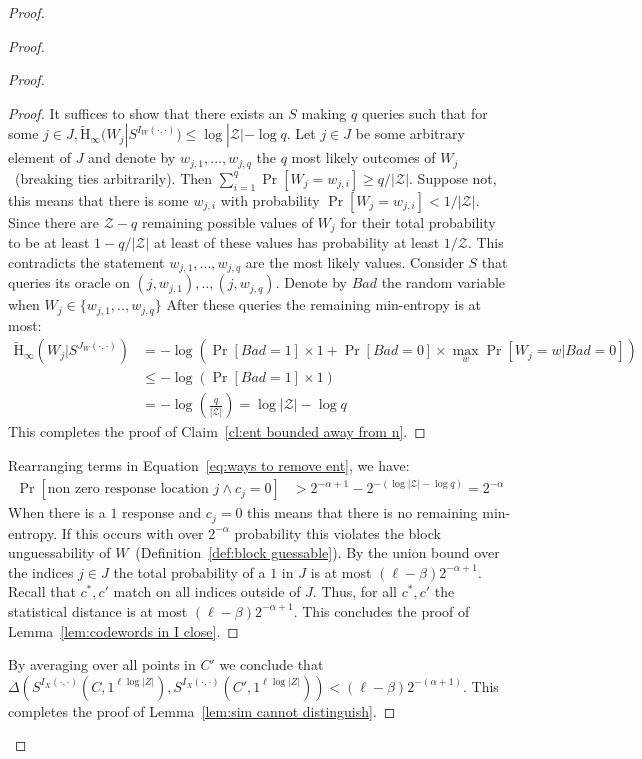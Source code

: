 \documentclass[11pt]{article}
\newcommand{\defref}[1]{\mbox{Definition~\ref{#1}}}
\newcommand{\lemref}[1]{\mbox{Lemma~\ref{#1}}}
\newcommand{\clref}[1]{\mbox{Claim~\ref{#1}}}
\newcommand{\Hav}{\tilde{\mathrm{H}}_\infty}
\begin{document}
\begin{proof}
\begin{proof}
\begin{proof}
\begin{proof}
It suffices to show that there exists an $S$ making $q$ queries such that for some $j\in J, \Hav(W_j | S^{I_{W}(\cdot, \cdot)})\le \log |\mathcal{Z}| - \log q$.  Let $j\in J$ be some arbitrary element of $J$ and denote by $w_{j,1}, ..., w_{j,q}$ the $q$ most likely outcomes of $W_j$~(breaking ties arbitrarily).  Then $\sum_{i=1}^q \Pr[W_j = w_{j,i}]\geq q/|\mathcal{Z}|$.  Suppose not, this means that there is some $w_{j,i}$ with probability $\Pr[W_j = w_{j,i}] < 1/|\mathcal{Z}|$.  Since there are $\mathcal{Z} - q $ remaining possible values of $W_j$ for their total probability to be at least $1-q/|\mathcal{Z}|$ at least of these values has probability at least $1/\mathcal{Z}$.  This contradicts the statement $w_{j,1},..., w_{j,q}$ are the most likely values.  Consider $S$ that queries its oracle on $(j, w_{j,1}),.., (j, w_{j,q})$.  Denote by $Bad$ the random variable when $W_j\in \{w_{j,1},.., w_{j,q}\}$  After these queries the remaining min-entropy is at most:
\begin{align*}
\Hav(W_j | S^{J_W(\cdot, \cdot)}) &=  -\log \left(\Pr[Bad=1]\times 1+ \Pr[Bad=0]\times \max_{w}\Pr[W_j = w| Bad =0]\right)\\
&\leq  -\log \left(\Pr[Bad=1]\times 1\right)\\
&=-\log\left( \frac{q}{|\mathcal{Z}|} \right) = \log|\mathcal{Z}|-\log q
\end{align*}
This completes the proof of \clref{cl:ent bounded away from n}.
\end{proof}
\noindent
Rearranging terms in Equation~\ref{eq:ways to remove ent}, we have:
\begin{align*}
 \Pr[\text{non zero response location }j \wedge c_j=0] &>2^{-\alpha+1} - 2^{-(\log |\mathcal{Z}|-\log q)}=  2^{-\alpha}
 \end{align*}
 When there is a $1$ response and $c_j=0$ this means that there is no remaining min-entropy.  If this occurs with over $2^{-\alpha}$ probability this violates the block unguessability of $W$~(\defref{def:block guessable}).  By the union bound over the indices $j\in J$ the total probability of a $1$ in $J$ is at most $(\ell-\beta)2^{-\alpha+1}$. Recall that $c^*, c'$ match on all indices outside of $J$. Thus, for all $c^*, c'$ the statistical distance is at most $(\ell- \beta)2^{-\alpha+1}$.  This concludes the proof of \lemref{lem:codewords in I close}.
\end{proof}
By averaging over all points in $C'$ we conclude that $\Delta(S^{I_X(\cdot, \cdot)}(C, 1^{\ell \log |Z|}), S^{I_X(\cdot, \cdot)}(C', 1^{\ell \log |Z|})) < (\ell -\beta)2^{-(\alpha+1)}$.  This completes the proof of \lemref{lem:sim cannot distinguish}.
\end{proof}


\end{proof}
\end{document}
